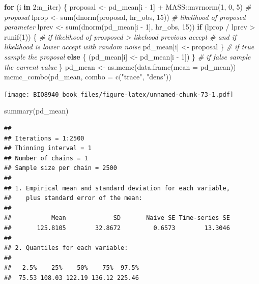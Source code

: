 \documentclass[
  12pt,
]{book}
\newenvironment{Shaded}{\begin{snugshade}}{\end{snugshade}}
\newcommand{\AttributeTok}[1]{\textcolor[rgb]{0.77,0.63,0.00}{#1}}
\newcommand{\CommentTok}[1]{\textcolor[rgb]{0.56,0.35,0.01}{\textit{#1}}}
\newcommand{\ControlFlowTok}[1]{\textcolor[rgb]{0.13,0.29,0.53}{\textbf{#1}}}
\newcommand{\DecValTok}[1]{\textcolor[rgb]{0.00,0.00,0.81}{#1}}
\newcommand{\FunctionTok}[1]{\textcolor[rgb]{0.00,0.00,0.00}{#1}}
\newcommand{\NormalTok}[1]{#1}
\newcommand{\OtherTok}[1]{\textcolor[rgb]{0.56,0.35,0.01}{#1}}
\newcommand{\SpecialCharTok}[1]{\textcolor[rgb]{0.00,0.00,0.00}{#1}}
\newcommand{\StringTok}[1]{\textcolor[rgb]{0.31,0.60,0.02}{#1}}
\begin{document}
\begin{Shaded}
\begin{Highlighting}[]
\ControlFlowTok{for}\NormalTok{ (i }\ControlFlowTok{in} \DecValTok{2}\SpecialCharTok{:}\NormalTok{n\_iter) \{}
\NormalTok{  proposal }\OtherTok{\textless{}{-}}\NormalTok{ pd\_mean[i }\SpecialCharTok{{-}} \DecValTok{1}\NormalTok{] }\SpecialCharTok{+}\NormalTok{ MASS}\SpecialCharTok{::}\FunctionTok{mvrnorm}\NormalTok{(}\DecValTok{1}\NormalTok{, }\DecValTok{0}\NormalTok{, }\DecValTok{5}\NormalTok{) }\CommentTok{\# proposal}
\NormalTok{  lprop }\OtherTok{\textless{}{-}} \FunctionTok{sum}\NormalTok{(}\FunctionTok{dnorm}\NormalTok{(proposal, hr\_obs, }\DecValTok{15}\NormalTok{)) }\CommentTok{\# likelihood of proposed parameter}
\NormalTok{  lprev }\OtherTok{\textless{}{-}} \FunctionTok{sum}\NormalTok{(}\FunctionTok{dnorm}\NormalTok{(pd\_mean[i }\SpecialCharTok{{-}} \DecValTok{1}\NormalTok{], hr\_obs, }\DecValTok{15}\NormalTok{))}
  \ControlFlowTok{if}\NormalTok{ (lprop }\SpecialCharTok{/}\NormalTok{ lprev }\SpecialCharTok{\textgreater{}} \FunctionTok{runif}\NormalTok{(}\DecValTok{1}\NormalTok{)) \{ }\CommentTok{\# if likelihood of prosposed \textgreater{} likehood previous accept}
    \CommentTok{\# and if likelihood is lower accept with random noise}
\NormalTok{    pd\_mean[i] }\OtherTok{\textless{}{-}}\NormalTok{ proposal}
\NormalTok{  \} }\CommentTok{\# if true sample the proposal}
  \ControlFlowTok{else}\NormalTok{ \{}
\NormalTok{    (pd\_mean[i] }\OtherTok{\textless{}{-}}\NormalTok{ pd\_mean[i }\SpecialCharTok{{-}} \DecValTok{1}\NormalTok{])}
\NormalTok{  \} }\CommentTok{\# if false sample the current value}
\NormalTok{\}}
\NormalTok{pd\_mean }\OtherTok{\textless{}{-}} \FunctionTok{as.mcmc}\NormalTok{(}\FunctionTok{data.frame}\NormalTok{(}\AttributeTok{mean =}\NormalTok{ pd\_mean))}
\FunctionTok{mcmc\_combo}\NormalTok{(pd\_mean, }\AttributeTok{combo =} \FunctionTok{c}\NormalTok{(}\StringTok{"trace"}\NormalTok{, }\StringTok{"dens"}\NormalTok{))}
\end{Highlighting}
\end{Shaded}

\texttt{[image: BIO8940\_book\_files/figure-latex/unnamed-chunk-73-1.pdf]}

\begin{Shaded}
\begin{Highlighting}[]
\FunctionTok{summary}\NormalTok{(pd\_mean)}
\end{Highlighting}
\end{Shaded}

\begin{verbatim}
## 
## Iterations = 1:2500
## Thinning interval = 1 
## Number of chains = 1 
## Sample size per chain = 2500 
## 
## 1. Empirical mean and standard deviation for each variable,
##    plus standard error of the mean:
## 
##           Mean             SD       Naive SE Time-series SE 
##       125.8105        32.8672         0.6573        13.3046 
## 
## 2. Quantiles for each variable:
## 
##   2.5%    25%    50%    75%  97.5% 
##  75.53 108.03 122.19 136.12 225.46
\end{verbatim}
\end{document}
